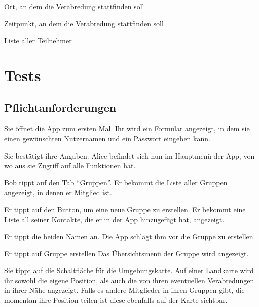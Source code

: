 \documentclass[parskip=full,11pt]{scrartcl}
\begin{document}
Ort, an dem die Verabredung stattfinden soll

Zeitpunkt, an dem die Verabredung stattfinden soll

Liste aller Teilnehmer

\pagebreak
\section{Tests}
\subsection{Pflichtanforderungen}

{Sie öffnet die App zum ersten Mal.}
{Ihr wird ein Formular angezeigt, in dem sie einen gewünschten Nutzernamen
und ein Passwort eingeben kann.}

{Sie bestätigt ihre Angaben.}
{Alice befindet sich nun im Hauptmenü der App, von wo aus sie Zugriff auf alle Funktionen hat.}


{Bob tippt auf den Tab  \enquote{Gruppen}.}
{Er bekommt die Liste aller Gruppen angezeigt, in denen er Mitglied ist.}

{Er tippt auf den Button, um eine neue Gruppe zu erstellen.}
{Er bekommt eine Liste all seiner Kontakte, die er in der App hinzugefügt hat, angezeigt.}

{Er tippt die beiden Namen an.}
{Die App schlägt ihm vor die Gruppe zu erstellen.}

{Er tippt auf Gruppe erstellen}
{Das Übersichtsmenü der Gruppe wird angezeigt.}

{Sie tippt auf die Schaltfläche für die Umgebungskarte.}
{Auf einer Landkarte wird ihr sowohl die eigene Position, als auch die von ihren
eventuellen Verabredungen in ihrer Nähe angezeigt.
Falls es andere Mitglieder in ihren Gruppen gibt, die momentan
ihre Position teilen ist diese ebenfalls auf der Karte sichtbar.}
\end{document}
